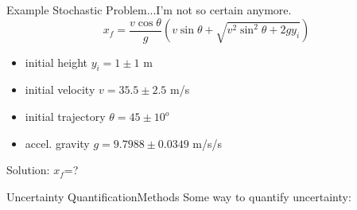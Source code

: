 \documentclass{beamer}
\begin{document}
\begin{frame}{Example Stochastic Problem}{...I'm not so certain anymore.}\vspace{-50pt}
\begin{equation*}
x_f=\frac{v\cos{\theta}}{g}\left(v\sin\theta+\sqrt{v^2\sin^2\theta + 2gy_i}\right)
\end{equation*}
\begin{itemize}
\item initial height $y_i = 1\pm1$ m
\item initial velocity $v = 35.5\pm2.5$ m/s
\item initial trajectory $\theta = 45\pm10^o$
\item accel. gravity $g = 9.7988 \pm0.0349$ m/s/s
\end{itemize}
Solution: $x_f$=?
\end{frame}

\begin{frame}{Uncertainty Quantification}{Methods}\vspace{-20pt}
Some way to quantify uncertainty:
\end{frame}
\end{document}
